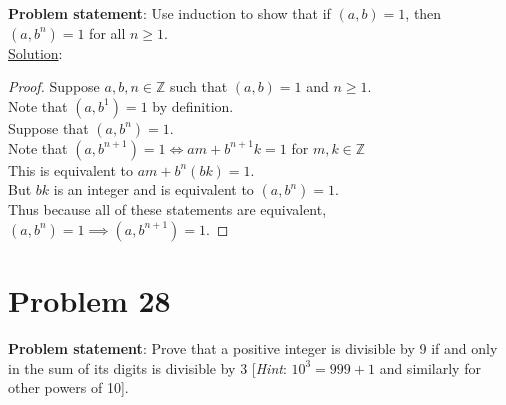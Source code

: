 \documentclass{article} %
\begin{document}
\textbf{Problem statement}: Use induction to show that if $(a,b) = 1$, then $(a,b^n) = 1$ for all $n \geq 1$.
\\

\underline{Solution}: 
\begin{addmargin}[1em]{0em}
\begin{proof}
Suppose $a,b,n \in \mathbb{Z}$ such that $(a,b) = 1$ and $n \geq 1$.
\\ 
Note that $(a, b^1) = 1$ by definition.
\\ 
Suppose that $(a, b^n) = 1$.
\\ 
Note that $(a, b^{n+1}) = 1 \Leftrightarrow am + b^{n+1}k = 1$ for $m, k \in \mathbb{Z}$
\\This is equivalent to $am + b^n(bk) = 1$.
\\But $bk$ is an integer and is equivalent to $(a,b^n) = 1$.
\\Thus because all of these statements are equivalent, $(a,b^n) = 1 \implies (a,b^{n+1}) = 1$.
\end{proof}
\end{addmargin}

\newpage

\section*{Problem 28}


\textbf{Problem statement}: Prove that a positive integer is divisible by 9 if and only in the sum of its digits is divisible by 3 [\textit{Hint}: $10^3 = 999 + 1$ and similarly for other powers of 10].
\\
\end{document}
